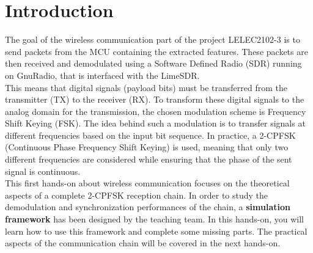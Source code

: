\section*{Introduction}

 The goal of the wireless communication part of the project LELEC2102-3 is to send packets from the MCU containing the extracted features. These packets are then received and demodulated using a Software Defined Radio (SDR) running on GnuRadio, that is interfaced with the LimeSDR.\\

This means that digital signals (payload bits) must be transferred from the transmitter (TX) to the receiver (RX). To transform these digital signals to the analog domain for the transmission, the chosen modulation scheme is Frequency Shift Keying (FSK). The idea behind such a modulation is to transfer signals at different frequencies based on the input bit sequence. In practice, a 2-CPFSK (Continuous Phase Frequency Shift Keying) is used, meaning that only two different frequencies are considered while ensuring that the phase of the sent signal is continuous.\\

This first hands-on about wireless communication focuses on the theoretical aspects of a complete 2-CPFSK reception chain. In order to study the demodulation and synchronization performances of the chain, a \textbf{simulation framework} has been designed by the teaching team. In this hands-on, you will learn how to use this framework and complete some missing parts. The practical aspects of the communication chain will be covered in the next hands-on.
